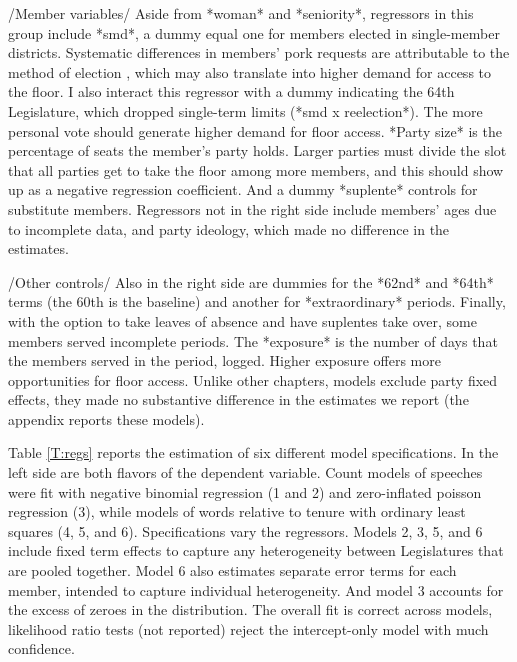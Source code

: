 \documentclass[letter,12pt]{article}
\begin{document}
/Member variables/ Aside from *woman* and *seniority*, regressors in this group include *smd*, a dummy equal one for members elected in single-member districts. Systematic differences in members' pork requests are attributable to the method of election \citep{kerevelPork2015}, which may also translate into higher demand for access to the floor. I also interact this regressor with a dummy indicating the 64th Legislature, which dropped single-term limits (*smd x reelection*). The more personal vote should generate higher demand for floor access. *Party size* is the percentage of seats the member's party holds. Larger parties must divide the slot that all parties get to take the floor among more members, and this should show up as a negative regression coefficient. And a dummy *suplente* controls for substitute members. Regressors not in the right side include members' ages due to incomplete data, and party ideology, which made no difference in the estimates.

/Other controls/ Also in the right side are dummies for the *62nd* and *64th* terms (the 60th is the baseline) and another for *extraordinary* periods. Finally, with the option to take leaves of absence and have suplentes take over, some members served incomplete periods. The *exposure* is the number of days that the members served in the period, logged. Higher exposure offers more opportunities for floor access. Unlike other chapters, models exclude party fixed effects, they made no substantive difference in the estimates we report (the appendix reports these models).


Table \ref{T:regs} reports the estimation of six different model specifications. In the left side are both flavors of the dependent variable. Count models of speeches were fit with negative binomial regression (1 and 2) and zero-inflated poisson regression (3), while models of words relative to tenure with ordinary least squares (4, 5, and 6). Specifications vary the regressors. Models 2, 3, 5, and 6 include fixed term effects to capture any heterogeneity between Legislatures that are pooled together. Model 6 also estimates separate error terms for each member, intended to capture individual heterogeneity. And model 3 accounts for the excess of zeroes in the distribution. The overall fit is correct across models, likelihood ratio tests (not reported) reject the intercept-only model with much confidence.
\end{document}
